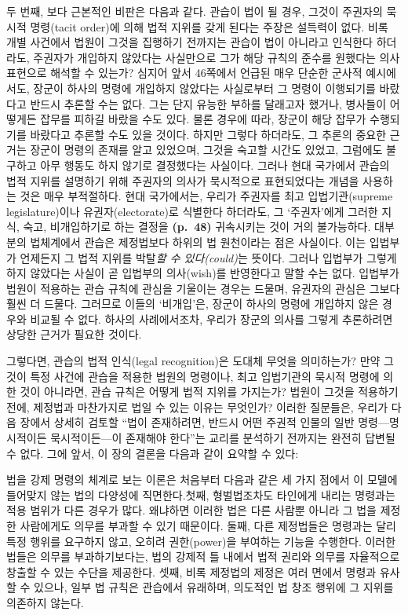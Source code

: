 \documentclass[12pt, oneside]{book}  %
\begin{document}
두 번째, 보다 근본적인 비판은 다음과 같다. 관습이 법이 될 경우, 그것이
주권자의 묵시적 명령(tacit order)에 의해 법적 지위를 갖게 된다는 주장은
설득력이 없다. 비록 개별 사건에서 법원이 그것을 집행하기 전까지는 관습이
법이 아니라고 인식한다 하더라도, 주권자가 개입하지 않았다는 사실만으로
그가 해당 규칙의 준수를 원했다는 의사 표현으로 해석할 수 있는가? 심지어
앞서 46쪽에서 언급된 매우 단순한 군사적 예시에서도, 장군이 하사의 명령에
개입하지 않았다는 사실로부터 그 명령이 이행되기를 바랐다고 반드시 추론할
수는 없다. 그는 단지 유능한 부하를 달래고자 했거나, 병사들이 어떻게든
잡무를 피하길 바랐을 수도 있다. 물론 경우에 따라, 장군이 해당 잡무가
수행되기를 바랐다고 추론할 수도 있을 것이다. 하지만 그렇다 하더라도, 그
추론의 중요한 근거는 장군이 명령의 존재를 알고 있었으며, 그것을 숙고할
시간도 있었고, 그럼에도 불구하고 아무 행동도 하지 않기로 결정했다는
사실이다. 그러나 현대 국가에서 관습의 법적 지위를 설명하기 위해 주권자의
의사가 묵시적으로 표현되었다는 개념을 사용하는 것은 매우 부적절하다.
현대 국가에서는, 우리가 주권자를 최고 입법기관(supreme legislature)이나
유권자(electorate)로 식별한다 하더라도, 그 `주권자'에게 그러한 지식,
숙고, 비개입하기로 하는 결정을 \textbf{(p.~48)} 귀속시키는 것이 거의
불가능하다. 대부분의 법체계에서 관습은 제정법보다 하위의 법 원천이라는
점은 사실이다. 이는 입법부가 언제든지 그 법적 지위를 박탈\emph{할 수
있다(could)}는 뜻이다. 그러나 입법부가 그렇게 하지 않았다는 사실이 곧
입법부의 의사(wish)를 반영한다고 말할 수는 없다. 입법부가 법원이
적용하는 관습 규칙에 관심을 기울이는 경우는 드물며, 유권자의 관심은
그보다 훨씬 더 드물다. 그러므로 이들의 `비개입'은, 장군이 하사의 명령에
개입하지 않은 경우와 비교될 수 없다. 하사의 사례에서조차, 우리가 장군의
의사를 그렇게 추론하려면 상당한 근거가 필요한 것이다.

그렇다면, 관습의 법적 인식(legal recognition)은 도대체 무엇을
의미하는가? 만약 그것이 특정 사건에 관습을 적용한 법원의 명령이나, 최고
입법기관의 묵시적 명령에 의한 것이 아니라면, 관습 규칙은 어떻게 법적
지위를 가지는가? 법원이 그것을 적용하기 전에, 제정법과 마찬가지로 법일
수 있는 이유는 무엇인가? 이러한 질문들은, 우리가 다음 장에서 상세히
검토할 ``법이 존재하려면, 반드시 어떤 주권적 인물의 일반
명령---명시적이든 묵시적이든---이 존재해야 한다''는 교리를 분석하기
전까지는 완전히 답변될 수 없다. 그에 앞서, 이 장의 결론을 다음과 같이
요약할 수 있다:

법을 강제 명령의 체계로 보는 이론은 처음부터 다음과 같은 세 가지 점에서
이 모델에 들어맞지 않는 법의 다양성에 직면한다.첫째, 형벌법조차도
타인에게 내리는 명령과는 적용 범위가 다른 경우가 많다. 왜냐하면 이러한
법은 다른 사람뿐 아니라 그 법을 제정한 사람에게도 의무를 부과할 수 있기
때문이다. 둘째, 다른 제정법들은 명령과는 달리 특정 행위를 요구하지 않고,
오히려 권한(power)을 부여하는 기능을 수행한다. 이러한 법들은 의무를
부과하기보다는, 법의 강제적 틀 내에서 법적 권리와 의무를 자율적으로
창출할 수 있는 수단을 제공한다. 셋째, 비록 제정법의 제정은 여러 면에서
명령과 유사할 수 있으나, 일부 법 규칙은 관습에서 유래하며, 의도적인 법
창조 행위에 그 지위를 의존하지 않는다.
\end{document}
